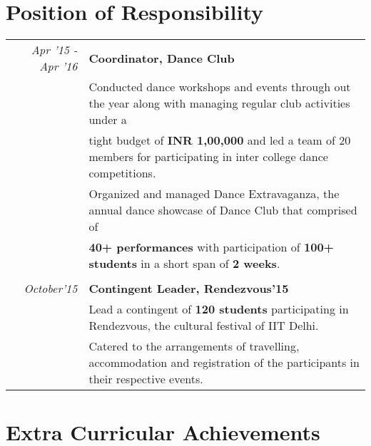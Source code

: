 \documentclass[a4paper]{norm-resume}
\begin{document}

\section{Position of Responsibility}

\vspace{1mm} %
		
\noindent\begin{tabular}{r|p{16cm}}	

\null \normalsize\emph{Apr '15 - Apr '16} & \textbf{Coordinator, Dance Club}\\
& \small{Conducted dance workshops and events through out the year along with managing regular club activities under a} \\
& \small{tight budget of \textbf{INR 1,00,000} and led a team of 20 members for participating in inter college dance competitions.}\\
& \small{Organized and managed Dance Extravaganza, the annual dance showcase of Dance Club that comprised of} \\
& \small{\textbf{40+ performances} with participation of \textbf{100+ students} in a short span of \textbf{2 weeks}.}\\

\multicolumn{2}{c}{} \\
\normalsize\emph{October'15} & \textbf{Contingent Leader, Rendezvous'15}\\
& \small{Lead a contingent of \textbf{120 students} participating in Rendezvous, the cultural festival of IIT Delhi.}\\
& \small{Catered to the arrangements of travelling, accommodation and registration of the participants in their respective events.} \\
\end{tabular}

\vspace{1mm}	%

\section{Extra Curricular Achievements}

\vspace{1mm} %
		
\end{document}
